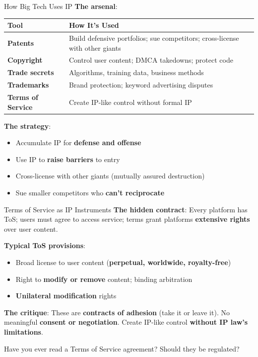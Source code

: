 ﻿\documentclass[aspectratio=169,11pt]{beamer}
\begin{document}
\begin{frame}{How Big Tech Uses IP}
\textbf{The arsenal}:

\begin{table}[h]
\centering
\small
\begin{tabular}{>{\bfseries}l p{7.5cm}}
\toprule
Tool & How It's Used \\
\midrule
Patents & Build defensive portfolios; sue competitors; cross-license with other giants \\
Copyright & Control user content; DMCA takedowns; protect code \\
Trade secrets & Algorithms, training data, business methods \\
Trademarks & Brand protection; keyword advertising disputes \\
Terms of Service & Create IP-like control without formal IP \\
\bottomrule
\end{tabular}
\end{table}

\vspace{0.2cm}
\textbf{The strategy}:
\begin{itemize}
    \item Accumulate IP for \textbf{defense and offense}
    \item Use IP to \textbf{raise barriers} to entry
    \item Cross-license with other giants (mutually assured destruction)
    \item Sue smaller competitors who \textbf{can't reciprocate}
\end{itemize}
\end{frame}

\begin{frame}{Terms of Service as IP Instruments}
\textbf{The hidden contract}: Every platform has ToS; users must agree to access service; terms grant platforms \textbf{extensive rights} over user content.

\vspace{0.2cm}
\textbf{Typical ToS provisions}:
\begin{itemize}
    \item Broad license to user content (\textbf{perpetual, worldwide, royalty-free})
    \item Right to \textbf{modify or remove} content; binding arbitration
    \item \textbf{Unilateral modification} rights
\end{itemize}

\vspace{0.1cm}
\textbf{The critique}: These are \textbf{contracts of adhesion} (take it or leave it). No meaningful \textbf{consent or negotiation}. Create IP-like control \textbf{without IP law's limitations}.

\begin{discussionbox}[Discussion]
Have you ever read a Terms of Service agreement? Should they be regulated?
\end{discussionbox}
\end{frame}
\end{document}
